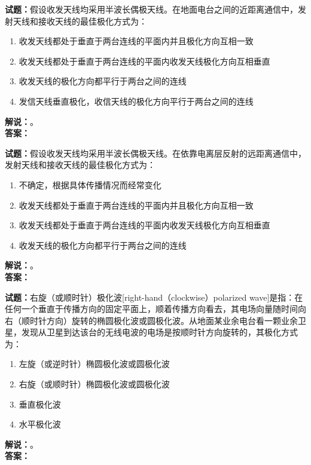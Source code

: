 \documentclass{ctexbook}
\begin{document}
\vspace{\baselineskip}

\noindent\textbf{试题：}假设收发天线均采用半波长偶极天线。在地面电台之间的近距离通信中，发射天线和接收天线的最佳极化方式为：
\begin{enumerate}[leftmargin=3em]
  \item 收发天线都处于垂直于两台连线的平面内并且极化方向互相一致
  \item 收发天线都处于垂直于两台连线的平面内收发天线极化方向互相垂直
  \item 收发天线的极化方向都平行于两台之间的连线
  \item 发信天线垂直极化，收信天线的极化方向平行于两台之间的连线
\end{enumerate}
\noindent\textbf{解说：}\textbf{}。\\\noindent\textbf{答案：}

\vspace{\baselineskip}

\noindent\textbf{试题：}假设收发天线均采用半波长偶极天线。在依靠电离层反射的远距离通信中，发射天线和接收天线的最佳极化方式为：
\begin{enumerate}[leftmargin=3em]
  \item 不确定，根据具体传播情况而经常变化
  \item 收发天线都处于垂直于两台连线的平面内并且极化方向互相一致
  \item 收发天线都处于垂直于两台连线的平面内收发天线极化方向互相垂直
  \item 收发天线的极化方向都平行于两台之间的连线
\end{enumerate}
\noindent\textbf{解说：}\textbf{}。\\\noindent\textbf{答案：}

\vspace{\baselineskip}

\noindent\textbf{试题：}右旋（或顺时针）极化波[right-hand（clockwise）polarized wave]是指：在任何一个垂直于传播方向的固定平面上，顺着传播方向看去，其电场向量随时间向右（顺时针方向）旋转的椭圆极化波或圆极化波。从地面某业余电台看一颗业余卫星，发现从卫星到达该台的无线电波的电场是按顺时针方向旋转的，其极化方式为：
\begin{enumerate}[leftmargin=3em]
  \item 左旋（或逆时针）椭圆极化波或圆极化波
  \item 右旋（或顺时针）椭圆极化波或圆极化波
  \item 垂直极化波
  \item 水平极化波
\end{enumerate}
\noindent\textbf{解说：}\textbf{}。\\\noindent\textbf{答案：}
\end{document}
